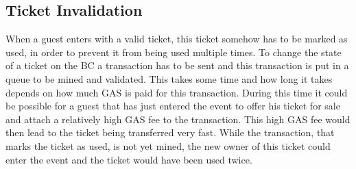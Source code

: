 
\subsection{Ticket Invalidation}\label{subsection:ticket-invalidation}

When a guest enters with a valid ticket, this ticket somehow has to be marked as used, in order to prevent it from being used multiple times. To change the state of a ticket on the BC a transaction has to be sent and this transaction is put in a queue to be mined and validated. This takes some time and how long it takes depends on how much GAS is paid for this transaction. During this time it could be possible for a guest that has just entered the event to offer his ticket for sale and attach a relatively high GAS fee to the transaction. This high GAS fee would then lead to the ticket being transferred very fast. While the transaction, that marks the ticket as used, is not yet mined, the new owner of this ticket could enter the event and the ticket would have been used twice.
